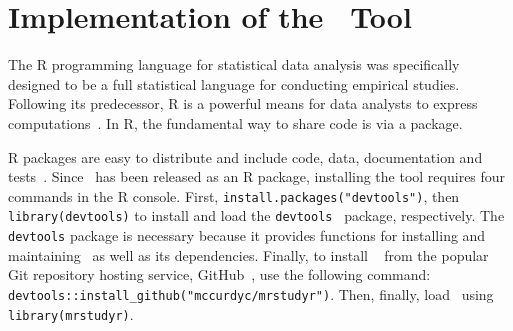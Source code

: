 \section{Implementation of the \mr~Tool}

The R programming language for statistical data analysis was specifically designed to
be a full statistical language for conducting empirical studies. Following its predecessor,
R is a powerful means for data analysts to express computations~\cite{ihaka1996r}.
In R, the fundamental way to share code is via a package.


R packages are easy to distribute and include code, data, documentation and tests~\cite{wickham2015r}.  Since \mr~has
been released as an R package, installing the tool requires four commands in the R console.  First,
\texttt{install.packages("devtools")}, then {\small\texttt{library(devtools)}} to install and load the
{\small\texttt{devtools}}~\cite{devtools} package, respectively.  The \texttt{devtools} package is necessary because it
provides functions for installing and maintaining \mr~as well as its dependencies.  Finally, to install \mr~\cite{tool}
from the popular Git repository hosting service, GitHub~\cite{github}, use the following command:
{\small\texttt{devtools::install\_github("mccurdyc/mrstudyr")}}.  Then, finally, load \mr~using
\texttt{library(mrstudyr)}.




